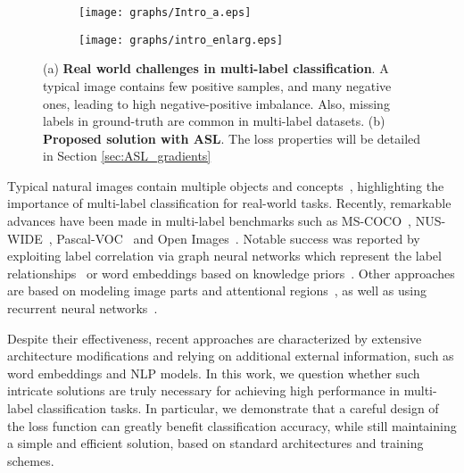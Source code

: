 \label{introduction} 

\begin{figure}\label{fig:intro_figure}
\begin{subfigure}[a]{.2\textwidth}
  \centering
  \texttt{[image: graphs/Intro\_a.eps]}
  \caption{}
  \label{fig:sfig1}
\end{subfigure}\begin{subfigure}[h]{.21\textwidth }
  \centering
  \texttt{[image: graphs/intro\_enlarg.eps]}
  \caption{}
  \label{fig:sfig2}
\end{subfigure}
\caption{(a) \textbf{Real world challenges in multi-label classification}. A typical image contains few positive samples, and many negative ones, leading to high negative-positive imbalance. Also, missing labels in ground-truth are common in multi-label datasets. (b) \textbf{Proposed solution with ASL}. 
The loss properties will be detailed in Section \ref{sec:ASL_gradients}}

\label{fig:fig}
\vspace{-3mm}
\end{figure}

Typical natural images contain multiple objects and concepts~\cite{yang2016exploit, yun2021relabel}, highlighting the importance of multi-label classification for real-world tasks. Recently, remarkable advances have been made in multi-label benchmarks such as MS-COCO~\cite{lin2014microsoft}, NUS-WIDE~\cite{chua2009nus}, Pascal-VOC~\cite{everingham2007pascal} and Open Images~\cite{kuznetsova2018open}. 
Notable success was reported by exploiting label correlation via graph neural networks which represent the label relationships~\cite{chen2019multi_MLGCN, chen2019multi, durand2019learning} or word embeddings based on knowledge priors~\cite{chen2019multi_MLGCN, Wang2019MultiLabelCW}. Other approaches are based on modeling image parts and attentional regions~\cite{you2020cross,gao2020multi,wang2017multi,yeattention}, as well as using recurrent neural networks~\cite{nam2017maximizing, wang2016cnn}.



Despite their effectiveness, recent approaches are characterized by extensive architecture modifications and relying on additional external information, such as word embeddings and NLP models. In this work, we question whether such intricate solutions are truly necessary for achieving high performance in multi-label classification tasks.
In particular, we demonstrate that a careful design of the loss function can greatly benefit classification accuracy, while still maintaining a simple and efficient solution, based on standard architectures and training schemes.

